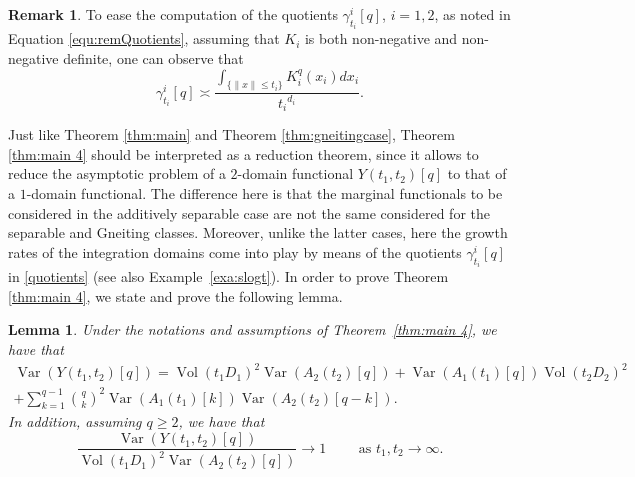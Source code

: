\documentclass[12pt]{article}
\DeclareMathOperator{\var}{Var}
\DeclareMathOperator{\1}{1}
\DeclareMathOperator{\vol}{Vol}
\theoremstyle{plain}
\newtheorem{lemma}[theorem]{Lemma}
\theoremstyle{definition}
\newtheorem{remark}{Remark}
\begin{document}
\begin{remark}\label{rem:Quotients}
To ease the computation of the quotients $\gamma^i_{t_i}[q]$, $i=1,2$, as noted in Equation \eqref{equ:remQuotients}, assuming that $K_i$ is both non-negative and non-negative definite, one can observe that \begin{equation}
    \gamma_{t_i}^i[q]\asymp\frac{\int_{ \{ \|x\|\le t_i \}} K_i^q(x_i)dx_i}{{t_i}^{d_i}} .
\end{equation}
\end{remark}

Just like Theorem \ref{thm:main} and Theorem \ref{thm:gneitingcase}, Theorem \ref{thm:main 4} should be interpreted as a reduction theorem, since it allows to reduce the asymptotic problem of a $2$-domain functional ${Y}(t_1,t_2)[q]$ to that of a $1$-domain functional.
The difference here is that the marginal functionals to be considered in the additively separable case are not the same considered for the separable and Gneiting classes. Moreover, unlike the latter cases, here the growth rates of the integration domains come into play by means of the quotients $\gamma_{t_i}^i[q]$ in \eqref{quotients} (see also Example~\ref{exa:slogt}). In order to prove Theorem \ref{thm:main 4}, we state and prove the following lemma.
\begin{lemma}\label{lem:var_sum_2} Under the notations and assumptions of Theorem~\ref{thm:main 4}, we have that
    \begin{multline}\label{equ:thm_red_sum_2}
        \var(Y({t_1,t_2})[q]) = \vol(t_1D_1)^2  \var(A_2({{t_2}})[q])+\var(A_1({t_1})[q])\vol({t_2}D_2)^2\\
        +\sum_{k=1}^{q-1} \binom{q}{k}^2 \var(A_1(t_1)[k])\var(A_2({t_2})[q-k]).
    \end{multline}
    In addition, assuming $q\ge2$, we have that
    \begin{equation}
     \frac{\var(Y(t_1,t_2)[q])}{\vol(t_1D_1)^2 \var(A_2(t_2)[q])}\longrightarrow 1\quad \quad \text{ as }t_1,t_2\rightarrow\infty.
    \end{equation}
\end{lemma}
\end{document}

